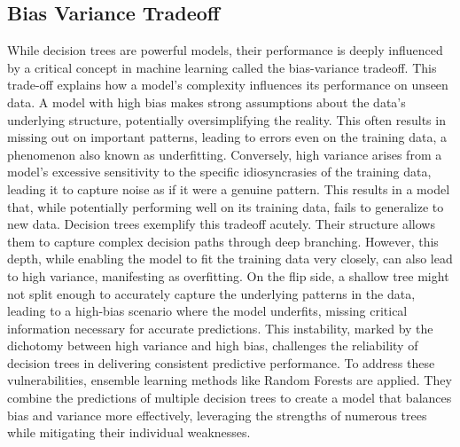 \documentclass[12pt]{article}
\begin{document}
\subsection{Bias Variance Tradeoff}
While decision trees are powerful models, their performance is deeply influenced by a critical concept in machine learning called the bias-variance tradeoff. 
This trade-off explains how a model's complexity influences its performance on unseen data. 
A model with high bias makes strong assumptions about the data's underlying structure, potentially oversimplifying the reality. This often results in missing out on important patterns, leading to errors even on the training data, a phenomenon also known as underfitting. 
Conversely, high variance arises from a model's excessive sensitivity to the specific idiosyncrasies of the training data, leading it to capture noise as if it were a genuine pattern. This results in a model that, while potentially performing well on its training data, fails to generalize to new data.
Decision trees exemplify this tradeoff acutely. Their structure allows them to capture complex decision paths through deep branching. However, this depth, while enabling the model to fit the training data very closely, can also lead to high variance, manifesting as overfitting. On the flip side, a shallow tree might not split enough to accurately capture the underlying patterns in the data, leading to a high-bias scenario where the model underfits, missing critical information necessary for accurate predictions.
This instability, marked by the dichotomy between high variance and high bias, challenges the reliability of decision trees in delivering consistent predictive performance.
To address these vulnerabilities, ensemble learning methods like Random Forests  \cite{article} are applied. They combine the predictions of multiple decision trees to create a model that balances bias and variance more effectively, leveraging the strengths of numerous trees while mitigating their individual weaknesses.
\end{document}
